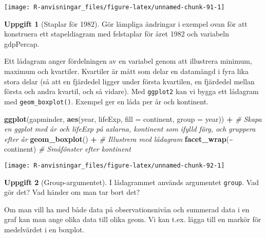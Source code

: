 \documentclass[
]{book}
\newenvironment{Shaded}{\begin{snugshade}}{\end{snugshade}}
\newcommand{\AttributeTok}[1]{\textcolor[rgb]{0.13,0.29,0.53}{#1}}
\newcommand{\CommentTok}[1]{\textcolor[rgb]{0.56,0.35,0.01}{\textit{#1}}}
\newcommand{\FunctionTok}[1]{\textcolor[rgb]{0.13,0.29,0.53}{\textbf{#1}}}
\newcommand{\NormalTok}[1]{#1}
\newcommand{\SpecialCharTok}[1]{\textcolor[rgb]{0.81,0.36,0.00}{\textbf{#1}}}
\theoremstyle{definition}
\theoremstyle{definition}
\theoremstyle{definition}
\newtheorem{exercise}{Uppgift}[chapter]
\theoremstyle{definition}
\theoremstyle{remark}
\begin{document}
\begin{center}\texttt{[image: R-anvisningar\_files/figure-latex/unnamed-chunk-91-1]} \end{center}

\begin{exercise}[Staplar för 1982]
Gör lämpliga ändringar i exempel ovan för att konstruera ett stapeldiagram med felstaplar för året 1982 och variabeln gdpPercap.
\end{exercise}

Ett lådagram anger fördelningen av en variabel genom att illustrera minimum, maximum och kvartiler. Kvartiler är mått som delar en datamängd i fyra lika stora delar (så att en fjärdedel ligger under första kvartilen, en fjärdedel mellan första och andra kvartil, och så vidare). Med \texttt{ggplot2} kan vi bygga ett lådagram med \texttt{geom\_boxplot()}. Exempel ger en låda per år och kontinent.

\begin{Shaded}
\begin{Highlighting}[]
\FunctionTok{ggplot}\NormalTok{(gapminder, }\FunctionTok{aes}\NormalTok{(year, lifeExp, }\AttributeTok{fill =}\NormalTok{ continent, }\AttributeTok{group =}\NormalTok{ year)) }\SpecialCharTok{+}        \CommentTok{\# Skapa en ggplot med år och lifeExp på axlarna, kontinent som ifylld färg, och gruppera efter år}
  \FunctionTok{geom\_boxplot}\NormalTok{() }\SpecialCharTok{+}                                                             \CommentTok{\# Illustrera med lådagram}
  \FunctionTok{facet\_wrap}\NormalTok{(}\SpecialCharTok{\textasciitilde{}}\NormalTok{ continent)                                                      }\CommentTok{\# Småfönster efter kontinent}
\end{Highlighting}
\end{Shaded}

\begin{center}\texttt{[image: R-anvisningar\_files/figure-latex/unnamed-chunk-92-1]} \end{center}

\begin{exercise}[Group-argumentet]
I lådagrammet används argumentet \texttt{group}. Vad gör det? Vad händer om man tar bort det?
\end{exercise}

Om man vill ha med både data på observationsnivån och summerad data i en graf kan man ange olika data till olika geom. Vi kan t.ex. lägga till en markör för medelvärdet i en boxplot.
\end{document}
